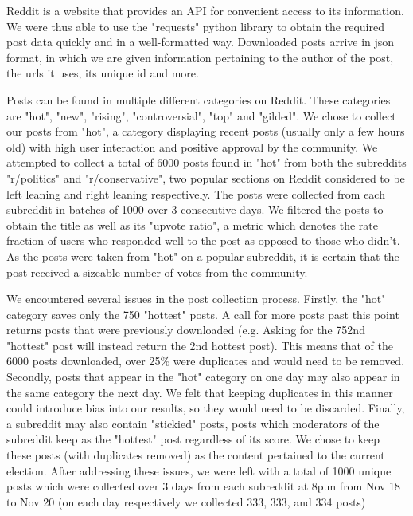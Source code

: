 \documentclass[11pt]{article}
\begin{document}
Reddit is a website that provides an API for convenient access to its information. We were thus able to use the "requests" python library to obtain the required post data quickly and in a well-formatted way. Downloaded posts arrive in json format, in which we are given information pertaining to the author of the post, the urls it uses, its unique id and more. 
\par
Posts can be found in multiple different categories on Reddit. These categories are "hot", "new", "rising", "controversial", "top" and "gilded". We chose to collect our posts from "hot", a category displaying recent posts (usually only a few hours old) with high user interaction and positive approval by the community. We attempted to collect a total of 6000 posts found in "hot" from both the subreddits "r/politics" and "r/conservative", two popular sections on Reddit considered to be left leaning and right leaning respectively. The posts were collected from each subreddit in batches of 1000 over 3 consecutive days. We filtered the posts to obtain the title as well as its "upvote ratio", a metric which denotes the rate fraction of users who responded well to the post as opposed to those who didn't. As the posts were taken from "hot" on a popular subreddit, it is certain that the post received a sizeable number of votes from the community.
\par 
We encountered several issues in the post collection process. Firstly, the "hot" category saves only the 750 "hottest" posts. A call for more posts past this point returns posts that were previously downloaded (e.g. Asking for the 752nd "hottest" post will instead return the 2nd hottest post). This means that of the 6000 posts downloaded, over 25\% were duplicates and would need to be removed. Secondly, posts that appear in the "hot" category on one day may also appear in the same category the next day. We felt that keeping duplicates in this manner could introduce bias into our results, so they would need to be discarded. Finally, a subreddit may also contain "stickied" posts, posts which moderators of the subreddit keep as the "hottest" post regardless of its score. We chose to keep these posts (with duplicates removed) as the content pertained to the current election. After addressing these issues, we were left with a total of 1000 unique posts which were collected over 3 days from each subreddit at 8p.m from Nov 18 to Nov 20 (on each day respectively we collected 333, 333, and 334 posts)
\par 
\end{document}
